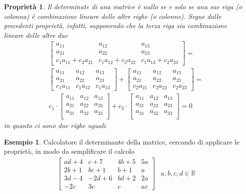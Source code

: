 \documentclass{book}
\theoremstyle{definition}
\newtheorem{es}{Esempio}[section]
\theoremstyle{plain}
\newtheorem{pro}{Proprietà}[section]
\begin{document}
\begin{pro}
  \label{pro:prodeldet9}
  Il determinate di una matrice è nullo se e solo se una sue riga
  (o colonna) è combinazione lineare delle altre righe (o colonne).
  Segue dalle precedenti proprietà, infatti, supponendo che la terza riga
  sia combinazione lineare delle altre due
  \begin{eqnarray*}
    \begin{bmatrix}
      a_{11} & a_{12} & a_{13}\\
      a_{21} & a_{22} & a_{23}\\
      c_1a_{11}+c_2a_{21} & c_1a_{12}+c_2a_{22} & c_1a_{13}+c_2a_{23}
    \end{bmatrix}=\\
    \begin{bmatrix}
       a_{11} & a_{12} & a_{13}\\
      a_{21} & a_{22} & a_{23}\\
      c_1a_{11} & c_1a_{12} & c_1a_{13}
    \end{bmatrix}+\begin{bmatrix}
      a_{11} & a_{12} & a_{13}\\
      a_{21} & a_{22} & a_{23}\\
      c_2a_{21} & c_2a_{22} & c_2a_{23}
    \end{bmatrix}=\\c_1\cdot
    \begin{bmatrix}
      a_{11} & a_{12} & a_{13}\\
      a_{21} & a_{22} & a_{23}\\
      a_{31} & a_{32} & a_{33}\\
    \end{bmatrix}+c_2\cdot \begin{bmatrix}
      a_{11} & a_{12} & a_{13}\\
      a_{21} & a_{22} & a_{23}\\
      a_{31} & a_{32} & a_{33}\\
    \end{bmatrix}=0
  \end{eqnarray*}
  in quanto ci sono due righe uguali.
\end{pro}
\begin{es}
  \label{es:prodeldet8}
  Calcolatore il determinante della matrice, cercando di applicare le
  proprietà, in modo da semplificare il calcolo
  \begin{eqnarray*}
    \begin{bmatrix}
      ad+4 & c+7 & 4b+5 & 5a\\
      2b+1 & bc + 1 & b + 1 & a\\
      3d - 4 & -2d + 6 & bd+2 & 2a\\
      -2c & 3c & c & ac
    \end{bmatrix} & a,b,c,d \in \mathds{R}
  \end{eqnarray*}
\end{es}
\end{document}
